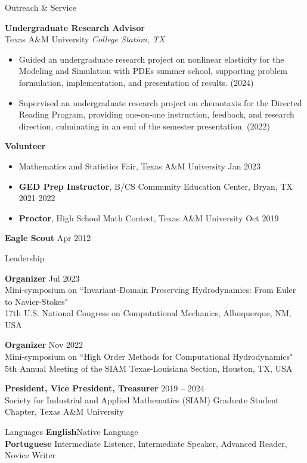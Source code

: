 \documentclass{resume} %
\begin{document}
\begin{rSection}{Outreach \& Service} 

\textbf{Undergraduate Research Advisor} \\ 
Texas A\&M University \hfill \textit{College Station, TX}
\begin{itemize}
    \item Guided an undergraduate research project on nonlinear elasticity for the Modeling and Simulation with PDEs summer school, supporting problem formulation, implementation, and presentation of results. (2024)
    \item Supervised an undergraduate research project on chemotaxis for the Directed Reading Program, providing one-on-one instruction, feedback, and research direction, culminating in an end of the semester presentation. (2022)
\end{itemize}

\textbf{Volunteer}
\begin{itemize}
    \item Mathematics and Statistics Fair, Texas A\&M University \hfill Jan 2023
    \item \textbf{GED Prep Instructor}, B/CS Community Education Center, Bryan, TX %
    \hfill 2021-2022
    \item \textbf{Proctor}, High School Math Contest, Texas A\&M University %
    \hfill Oct 2019
\end{itemize}

\textbf{Eagle Scout} \hfill Apr 2012

\end{rSection}

\begin{rSection}{Leadership}

\textbf{Organizer} \hfill Jul 2023 \\
Mini-symposium on ``Invariant-Domain Preserving Hydrodynamics: From Euler to Navier-Stokes" \\
17th U.S. National Congress on Computational Mechanics, Albuquerque, NM, USA

\textbf{Organizer} \hfill Nov 2022 \\
Mini-symposium on ``High Order Methods for Computational Hydrodynamics" \\
5th Annual Meeting of the SIAM Texas-Louisiana Section, Houston, TX, USA

\textbf{President, Vice President, Treasurer} \hfill 2019 -- 2024 \\
Society for Industrial and Applied Mathematics (SIAM) Graduate Student Chapter, Texas A\&M University

    
\end{rSection}

\begin{rSection}{Languages}
\textbf{English}\hfill Native Language \\
\textbf{Portuguese} \hfill Intermediate Listener, Intermediate Speaker, Advanced Reader, Novice Writer
\end{rSection}
\end{document}
